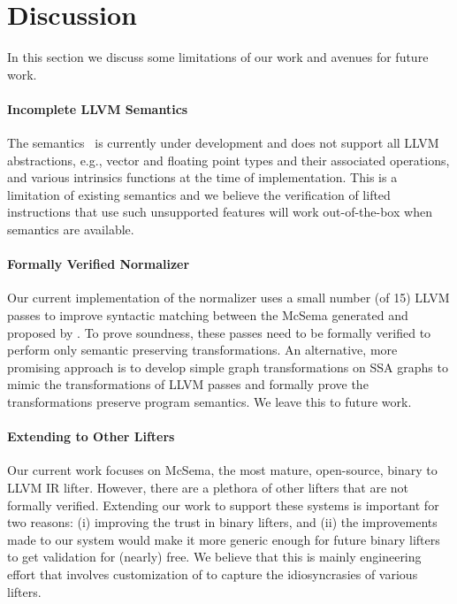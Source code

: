 \section{Discussion}\label{sec:discussion}

In this section we discuss some limitations of our work and avenues for future
work.

\paragraph{Incomplete LLVM Semantics} The \LLVM semantics~\cite{LLVMSEMA} is
currently under development and does not support all LLVM abstractions, e.g.,
vector and floating point types and their associated operations, and various
intrinsics functions at the time of implementation. This is a limitation of
existing semantics and we believe the verification of lifted instructions that
use such unsupported features will work out-of-the-box when semantics are
available.

\paragraph{Formally Verified Normalizer} Our current implementation of the
normalizer uses a small number (of 15) LLVM passes to improve syntactic
matching between the McSema generated  and  proposed by
\compd. To prove soundness, these passes need to be formally verified to
perform only semantic preserving transformations. An alternative, more
promising approach is to develop simple graph transformations on SSA graphs to
mimic the transformations of LLVM passes and formally prove the
transformations preserve program semantics. We leave this to future work.

\paragraph{Extending to Other Lifters} Our current work focuses on McSema, the
most mature, open-source, binary to LLVM IR lifter. However, there are a
plethora of other lifters that are not formally verified. Extending our work
to support these systems is important for two reasons: (i) improving the
trust in binary lifters, and (ii) the improvements made to our system would
make it more generic enough for future binary lifters to get validation for
(nearly) free. We believe that this is mainly engineering effort that involves
customization of \compd to capture the idiosyncrasies of various lifters.

